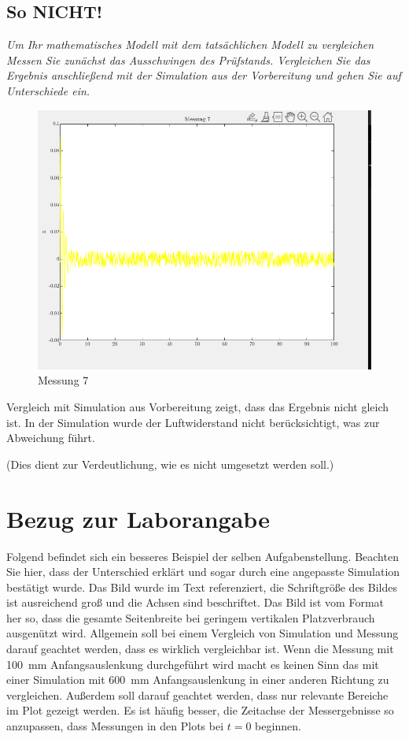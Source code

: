 \subsection{So NICHT!}
\textit{Um Ihr mathematisches Modell mit dem tatsächlichen Modell zu vergleichen Messen Sie zunächst das Ausschwingen des Prüfstands. Vergleichen Sie das Ergebnis anschließend mit der Simulation aus der Vorbereitung und gehen Sie auf Unterschiede ein.}
\begin{figure}[!ht]
	\centering
	\includegraphics[width=0.5\linewidth]{images/Negativbesipiel_sehr_schlecht}
	\caption{Messung 7}	   	
	\label{fig:negativbeispiel_sehr_schlecht}
\end{figure}

Vergleich mit Simulation aus Vorbereitung zeigt, dass das Ergebnis nicht gleich ist. In der Simulation wurde der Luftwiderstand nicht berücksichtigt, was zur Abweichung führt.

\noindent(Dies dient zur Verdeutlichung, wie es nicht umgesetzt werden soll.)



\section{Bezug zur Laborangabe}\label{sec:bezug_zur_Angabe}
Folgend befindet sich ein besseres Beispiel der selben Aufgabenstellung. Beachten Sie hier, dass der Unterschied erklärt und sogar durch eine angepasste Simulation bestätigt wurde. Das Bild wurde im Text referenziert, die Schriftgröße des Bildes ist ausreichend groß und die Achsen sind beschriftet. Das Bild ist vom Format her so, dass die gesamte Seitenbreite bei geringem vertikalen Platzverbrauch ausgenützt wird. Allgemein soll bei einem Vergleich von Simulation und Messung darauf geachtet werden, dass es wirklich vergleichbar ist. Wenn die Messung mit \SI{100}{\milli\meter} Anfangsauslenkung durchgeführt wird macht es keinen Sinn das mit einer Simulation mit \SI{600}{\milli\meter} Anfangsauslenkung in einer anderen Richtung zu vergleichen. Außerdem soll darauf geachtet werden, dass nur relevante Bereiche im Plot gezeigt werden. Es ist häufig besser, die Zeitachse der Messergebnisse so anzupassen, dass Messungen in den Plots bei $t=0$ beginnen.

